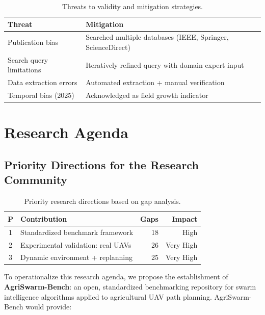 \documentclass[review, 12pt, times]{elsarticle}
\begin{document}
\begin{table}[htbp]
\centering
\caption{Threats to validity and mitigation strategies.}
\label{tab:threats}
\begin{tabularx}{\textwidth}{lX}
\toprule
\textbf{Threat} & \textbf{Mitigation} \\
\midrule
Publication bias & Searched multiple databases (IEEE,
Springer, ScienceDirect) \\
Search query limitations & Iteratively refined query with
domain expert input \\
Data extraction errors & Automated extraction + manual
verification \\
Temporal bias (2025) & Acknowledged as field growth
indicator \\
\bottomrule
\end{tabularx}
\end{table}

\section{Research Agenda}

\subsection{Priority Directions for the Research Community}

\begin{table}[htbp]
\centering
\caption{Priority research directions based on gap
analysis.}
\label{tab:priorities}
\begin{tabular}{clrr}
\toprule
\textbf{P} & \textbf{Contribution} &
\textbf{Gaps} & \textbf{Impact} \\
\midrule
1 & Standardized benchmark framework  & 18 & High \\
2 & Experimental validation: real UAVs & 26 & Very High \\
3 & Dynamic environment + replanning  & 25 & Very High \\
\bottomrule
\end{tabular}
\end{table}

To operationalize this research agenda, we propose the
establishment of \textbf{AgriSwarm-Bench}: an open,
standardized benchmarking repository for swarm intelligence
algorithms applied to agricultural UAV path planning.
AgriSwarm-Bench would provide:
\end{document}
